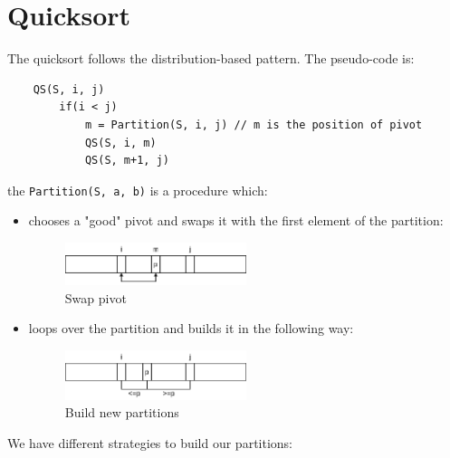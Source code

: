 \section{Quicksort}
The quicksort follows the distribution-based pattern. The pseudo-code is:
\begin{verbatim}
    QS(S, i, j)
        if(i < j)
            m = Partition(S, i, j) // m is the position of pivot
            QS(S, i, m)
            QS(S, m+1, j)
\end{verbatim}
the \verb|Partition(S, a, b)| is a procedure which:
\begin{itemize}
    \item chooses a "good" pivot and swaps it with the first element of the partition:
    \begin{figure}[H]
        \centering
        \includegraphics[width=200px]{images/2_Sorting/swap.png}
        \caption{Swap pivot}
    \end{figure}
    
    \item loops over the partition and builds it in the following way:
    \begin{figure}[H]
        \centering
        \includegraphics[width=200px]{images/2_Sorting/partitioned.png}
        \caption{Build new partitions}
    \end{figure}
\end{itemize}
We have different strategies to build our partitions:
